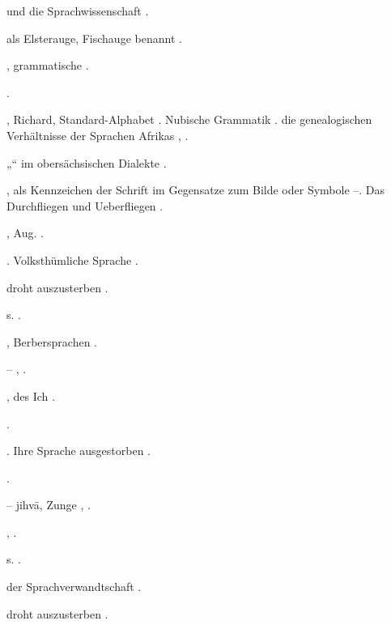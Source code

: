 \begin{register}
 und die Sprachwissenschaft \pageref{sp.27}.

 als  Elsterauge, Fischauge benannt \pageref{sp.41}.

, grammatische \pageref{sp.109}.

 \pageref{sp.163}.

, Richard, Standard-Alphabet \pageref{sp.38}\sed{, \pageref{sp.69}}. Nubische Grammatik \pageref{sp.161}.  die genealogischen Verhältnisse der Sprachen Afrikas \pageref{sp.282}, \pageref{sp.406}.

„“ im obersächsischen Dialekte \pageref{sp.316}.


, als Kennzeichen der Schrift im Gegensatze zum Bilde oder Symbole \pageref{sp.128}–\pageref{sp.129}. Das Durchfliegen und Ueberfliegen \pageref{sp.433}.

, Aug. \pageref{sp.254}.

. Volksthümliche Sprache \pageref{sp.46}\sed{, \pageref{sp.438}}.

 droht auszusterben \pageref{sp.146}.


 s. .

, Berbersprachen \pageref{sp.282}.

– \pageref{sp.122}, \pageref{sp.437}.

,  des Ich \pageref{sp.307}.

 \pageref{sp.280}.

. Ihre Sprache ausgestorben \pageref{sp.146}.

 \pageref{sp.287}.

 – jihvā, Zunge \pageref{sp.186}, \pageref{sp.217}.

 \pageref{sp.174}, \pageref{sp.183}.


 s. .

 der Sprachverwandtschaft \pageref{sp.145}.

 droht auszusterben \pageref{sp.146}.


\end{register}
